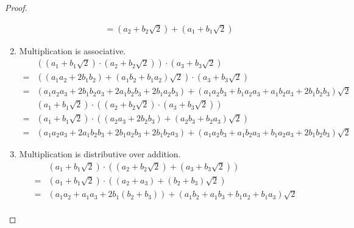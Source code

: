 \begin{proof}
\begin{enumerate}[label = (\arabic*)]
\begin{align*}
                                                                    & = (a_{2} + b_{2}\sqrt{2}) + (a_{1} + b_{1}\sqrt{2})
              \end{align*}
        \item Multiplication is associative.
              \begin{align*}
                    & \left((a_{1} + b_{1}\sqrt{2})\cdot (a_{2} + b_{2}\sqrt{2})\right)\cdot (a_{3} + b_{3}\sqrt{2})                                                                \\
                  = & \left((a_{1}a_{2} + 2b_{1}b_{2}) + (a_{1}b_{2} + b_{1}a_{2})\sqrt{2}\right)\cdot(a_{3} + b_{3}\sqrt{2})                                                       \\
                  = & (a_{1}a_{2}a_{3} + 2b_{1}b_{2}a_{3} + 2a_{1}b_{2}b_{3} + 2b_{1}a_{2}b_{3}) + (a_{1}a_{2}b_{3} + b_{1}a_{2}a_{3} + a_{1}b_{2}a_{3} + 2b_{1}b_{2}b_{3})\sqrt{2}
              \end{align*}
              \begin{align*}
                    & (a_{1} + b_{1}\sqrt{2})\cdot\left((a_{2} + b_{2}\sqrt{2})\cdot(a_{3} + b_{3}\sqrt{2})\right)                                                                  \\
                  = & (a_{1} + b_{1}\sqrt{2})\cdot\left( (a_{2}a_{3} + 2b_{2}b_{3}) + (a_{2}b_{3} + b_{2}a_{3})\sqrt{2} \right)                                                     \\
                  = & (a_{1}a_{2}a_{3} + 2a_{1}b_{2}b_{3} + 2b_{1}a_{2}b_{3} + 2b_{1}b_{2}a_{3}) + (a_{1}a_{2}b_{3} + a_{1}b_{2}a_{3} + b_{1}a_{2}a_{3} + 2b_{1}b_{2}b_{3})\sqrt{2}
              \end{align*}
        \item Multiplication is distributive over addition.
              \begin{align*}
                    & (a_{1} + b_{1}\sqrt{2})\cdot \left((a_{2} + b_{2}\sqrt{2}) + (a_{3} + b_{3}\sqrt{2})\right)                                                               \\
                  = & (a_{1} + b_{1}\sqrt{2})\cdot\left((a_{2} + a_{3}) + (b_{2} + b_{3})\sqrt{2}\right)                                                                        \\
                  = & (a_{1}a_{2} + a_{1}a_{3} + 2b_{1}(b_{2} + b_{3})) + (a_{1}b_{2} + a_{1}b_{3} + b_{1}a_{2} + b_{1}a_{3})\sqrt{2}                                           \\

\end{align*}
\end{enumerate}
\end{proof}
